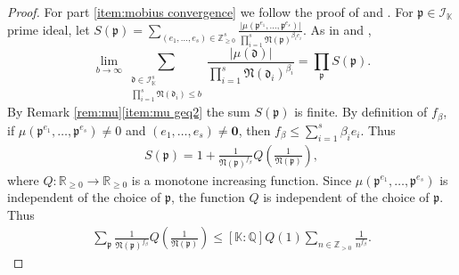 \documentclass[10pt, a4paper, reqno, english]{amsart}
\newcommand\ZZ{\mathbb{Z}}
\newcommand\RR{\mathbb{R}}
\newcommand\QQ{\mathbb{Q}}
\newcommand{\KK}{\mathbb{K}} %
\newcommand{\idealnorm}{\mathfrak{N}}
\theoremstyle{definition}
\numberwithin{theorem}{section}
\numberwithin{equation}{section}
\begin{document}
\begin{proof}
For part \ref{item:mobius convergence} we follow the proof of  \cite[Lemma 11.15]{MR1679841} and \cite[Proposition 4]{MR3514738}. 
For $\mathfrak p\in\mathcal I_{\KK}$  prime ideal,
let $S(\mathfrak p)=\sum_{(e_1,\dots,e_s)\in\ZZ_{\geq 0}^s}\frac{|\mu(\mathfrak p^{e_1},\dots,\mathfrak p^{e_s})|}{\prod_{i=1}^s\idealnorm(\mathfrak p)^{\beta_ie_i}}$.
As in \cite[Lemma 11.15]{MR1679841} and \cite[Proposition 4]{MR3514738},
$$
\lim_{b\to\infty}\sum_{\substack{\mathfrak d \in\mathcal I_{\KK}^s\\ \prod_{i=1}^s\idealnorm(\mathfrak d_i)\leq b}}\frac{|\mu(\mathfrak d)|}{\prod_{i=1}^s\idealnorm(\mathfrak d_i)^{\beta_i}}
=\prod_{\mathfrak p}S(\mathfrak p).
$$ 
By Remark \ref{rem:mu}\ref{item:mu geq2} the sum $S(\mathfrak p)$ is finite. By definition of $f_\beta$, if $\mu(\mathfrak p^{e_1},\dots,\mathfrak p^{e_s})\neq 0$ and $(e_1,\dots,e_s)\neq\mathbf 0$, then ${f_\beta}\leq \sum_{i=1}^s\beta_ie_i$. Thus
\begin{gather*}
S(\mathfrak p)=1+\frac 1{\idealnorm(\mathfrak p)^{f_\beta}}Q\left(\frac 1{\idealnorm(\mathfrak p)}\right),
\end{gather*}
where $Q:\RR_{\geq 0}\to \RR_{\geq 0}$ is a monotone increasing function.
Since $\mu(\mathfrak p^{e_1},\dots,\mathfrak p^{e_s})$ is independent of the choice of $\mathfrak p$, the function $Q$ is independent of the choice of $\mathfrak p$. Thus
\begin{gather*}
\sum_{\mathfrak p}\frac 1{\idealnorm(\mathfrak p)^{f_\beta}}Q\left(\frac 1{\idealnorm(\mathfrak p)}\right)
\leq [\KK:\QQ] Q(1) \sum_{n\in\ZZ_{>0}}\frac 1{n^{f_\beta}}. 
\end{gather*}


\end{proof}
\end{document}
